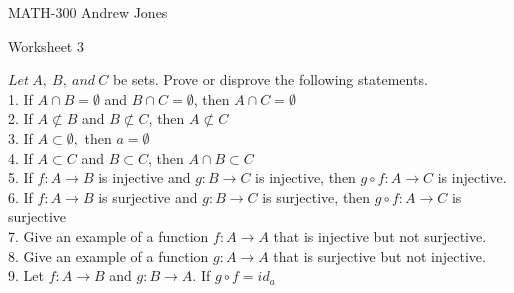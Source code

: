 \documentclass{article}
\begin{document}
  MATH-300 \hfill Andrew Jones
  \newline
  \begin{center}
  {\huge Worksheet 3}
  \end{center}
  $Let\ A,\ B,\ and\ C$ be sets. Prove or disprove the following statements. \\
  1. If $A\cap B = \emptyset$ and $B\cap C = \emptyset$, then $A\cap C = \emptyset$ \\
  2. If $A\not\subset B$ and $B\not\subset C$, then $A\not\subset C$ \\
  3. If $A\subset \emptyset,$ then $a= \emptyset$ \\
  4. If $A\subset C$ and $B\subset C$, then $A\cap B\subset C$ \\
  5. If $f : A\to B$ is injective and $g : B\to C$ is injective, then $g \circ f : A\to C$ is injective. \\
  6. If $f : A\to B$ is surjective and $g : B\to C$ is surjective, then $g \circ f : A\to C$ is surjective \\
  7. Give an example of a function $f : A\to A$ that is injective but not surjective. \\
  8. Give an example of a function $g : A\to A$ that is surjective but not injective. \\
  9. Let $f : A\to B$ and $g : B\to A$. If $g \circ f = id_{a}$ 
\end{document}
